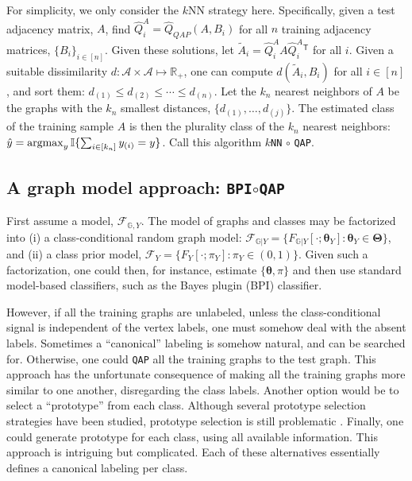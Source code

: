 \documentclass{article} %
\providecommand{\ve}[1]{\boldsymbol{#1}}
\newcommand{\argmax}{\operatornamewithlimits{argmax}}
\newcommand{\T}{^{\ensuremath{\mathsf{T}}}}           %
\newcommand{\II}{\mathbb{I}}           %
\newcommand{\bth}{\ve{\theta}}
\newcommand{\bTh}{\ve{\Theta}}
\providecommand{\mc}[1]{\mathcal{#1}}
\providecommand{\mh}[1]{\hat{#1}}
\providecommand{\mt}[1]{\widetilde{#1}}
\newcommand{\Real}{\mathbb{R}}
\newcommand{\GG}{\mathbb{G}}
\newcommand{\qap}{\texttt{QAP} }
\begin{document}
For simplicity, we only consider the $k$NN strategy here.  Specifically, given a test adjacency matrix, $A$, find $\mh{Q}_i^A=\mh{Q}_{QAP}(A,B_i)$ for all $n$ training adjacency matrices, $\{B_i\}_{i \in [n]}$.  Given these solutions, let $\mt{A}_i=\mh{Q}_i^A A {\mh{Q}_i^A}{}\T$ for all $i$. Given a suitable dissimilarity $d: \mc{A} \times \mc{A} \mapsto \Real_+$, one can compute $d(\mt{A}_i,B_i)$ for all $i \in [n]$, and sort them: $d_{(1)} \leq d_{(2)} \leq \cdots \leq d_{(n)}$.  Let the $k_n$ nearest neighbors of $A$ be the graphs with the $k_n$ smallest distances, $\{d_{(1)},\ldots, d_{(j)}\}$.  The estimated class of the training sample $A$ is then the plurality class of the $k_n$ nearest neighbors: $\mh{y}=\argmax_{y} \II\{\sum_{i \in [k_n]} y_{(i)} = y \}$. Call this algorithm \texttt{$k$NN} $\circ$ \texttt{QAP}.



\subsection{A graph model approach: \texttt{BPI}$\circ$\qap} %
\label{ssub:bayes_plugin_circ_qap}

First assume a model, $\mc{F}_{\GG,Y}$.  The model of graphs and classes may be factorized into (i) a class-conditional random graph model: $\mc{F}_{\GG  | Y} = \{F_{\GG|Y}[\cdot; \bth_Y] : \bth_Y \in \bTh\}$, and (ii) a class prior model, $\mc{F}_Y = \{F_Y[\cdot; \pi_Y] : \pi_Y \in (0,1)\}$.  Given such a factorization, one could then, for instance, estimate $\{\bth,\pi\}$ and then use standard model-based classifiers, such as the Bayes plugin (BPI) classifier.  

However, if all the training graphs are unlabeled, unless the class-conditional signal is independent of the vertex labels, one must somehow deal with the absent labels.  Sometimes a ``canonical'' labeling is somehow natural, and can be searched for.  Otherwise, one could \qap all the training graphs to the test graph.  This approach has the unfortunate consequence of making all the training graphs more similar to one another, disregarding the class labels.  Another option would be to select a ``prototype'' from each class. Although several prototype selection strategies have been studied, prototype selection is still problematic \cite{Bunke2011}.  Finally, one could generate prototype for each class, using all available information.  This approach is intriguing but complicated.  Each of these alternatives essentially defines a canonical labeling per class.
\end{document}
